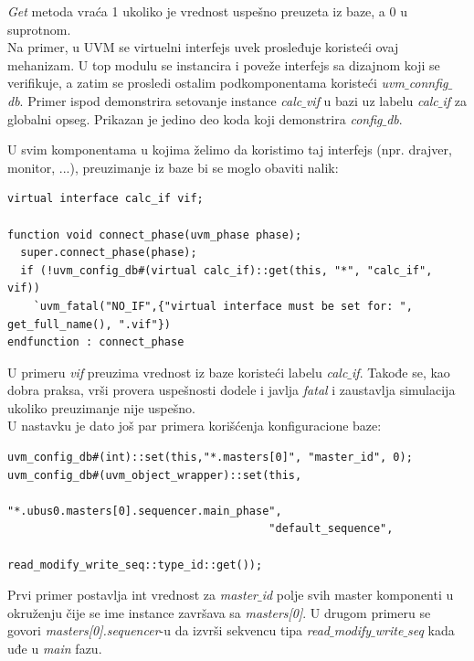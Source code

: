 \emph{Get} metoda vraća 1 ukoliko je vrednost uspešno preuzeta iz baze, a 0 u
suprotnom.\\

Na primer, u UVM se virtuelni interfejs uvek prosleđuje koristeći ovaj
mehanizam. U top modulu se instancira i poveže interfejs sa dizajnom koji se
verifikuje, a zatim se prosledi ostalim podkomponentama koristeći
\emph{uvm\(\_\)connfig\(\_\)db}. Primer ispod demonstrira setovanje instance
\emph{calc\(\_\)vif} u bazi uz labelu \emph{calc\(\_\)if} za globalni opseg.
Prikazan je jedino deo koda koji demonstrira \emph{config\(\_\)db}.



U svim komponentama u kojima želimo da koristimo taj interfejs (npr. drajver,
monitor, ...), preuzimanje iz baze bi se moglo obaviti nalik:

\begin{lstlisting}
virtual interface calc_if vif;

function void connect_phase(uvm_phase phase);
  super.connect_phase(phase);
  if (!uvm_config_db#(virtual calc_if)::get(this, "*", "calc_if", vif))
    `uvm_fatal("NO_IF",{"virtual interface must be set for: ", get_full_name(), ".vif"})
endfunction : connect_phase
\end{lstlisting}

U primeru \emph{vif} preuzima vrednost iz baze koristeći labelu \emph{calc\(\_\)if}.
Takođe se, kao dobra praksa, vrši provera uspešnosti dodele i javlja
\emph{fatal} i zaustavlja simulacija ukoliko preuzimanje nije uspešno.\\

U nastavku je dato još par primera korišćenja konfiguracione baze:

\begin{lstlisting}
uvm_config_db#(int)::set(this,"*.masters[0]", "master_id", 0);
uvm_config_db#(uvm_object_wrapper)::set(this,
                                        "*.ubus0.masters[0].sequencer.main_phase",
                                        "default_sequence",
                                        read_modify_write_seq::type_id::get());
\end{lstlisting}

Prvi primer postavlja int vrednost za \emph{master\(\_\)id} polje svih master
komponenti u okruženju čije se ime instance završava sa \emph{masters[0]}. U
drugom primeru se govori \emph{masters[0].sequencer}-u da izvrši sekvencu tipa
\emph{read\(\_\)modify\(\_\)write\(\_\)seq} kada uđe u \emph{main} fazu.\\

